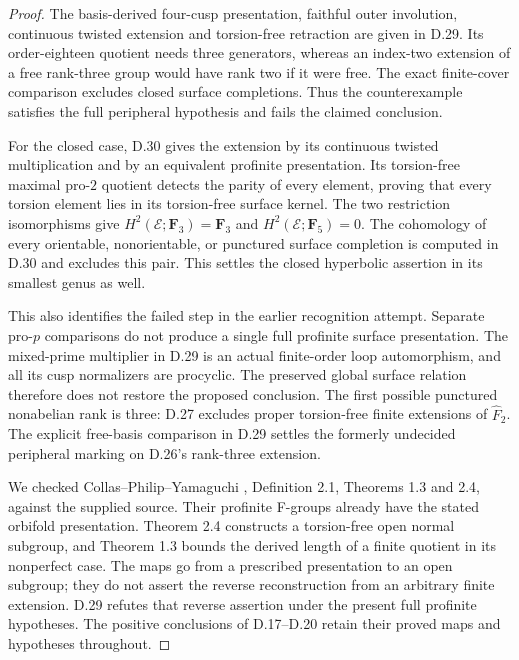 \begin{proof}
The basis-derived four-cusp presentation, faithful outer involution,
continuous twisted extension and torsion-free retraction are given
in D.29.  Its order-eighteen quotient needs three generators, whereas
an index-two extension of a free rank-three group would have rank two
if it were free.  The exact finite-cover comparison excludes closed
surface completions.  Thus the counterexample satisfies the full
peripheral hypothesis and fails the claimed conclusion.

For the closed case, D.30 gives the extension by its continuous
twisted multiplication and by an equivalent profinite presentation.
Its torsion-free maximal pro-$2$ quotient detects the parity of
every element, proving that every torsion element lies in its
torsion-free surface kernel. The two restriction isomorphisms give
$H^2(\mathcal E;\mathbf F_3)=\mathbf F_3$ and
$H^2(\mathcal E;\mathbf F_5)=0$. The cohomology of every orientable,
nonorientable, or punctured surface completion is computed in
D.30 and excludes this pair. This settles the closed hyperbolic
assertion in its smallest genus as well.

This also identifies the failed step in the earlier recognition
attempt.  Separate pro-$p$ comparisons do not produce a single
full profinite surface presentation.  The mixed-prime multiplier
in D.29 is an actual finite-order loop automorphism, and all its
cusp normalizers are procyclic.  The preserved global surface
relation therefore does not restore the proposed conclusion.
The first possible punctured nonabelian rank is three: D.27 excludes
proper torsion-free finite extensions of $\widehat F_2$.
The explicit free-basis comparison in D.29 settles the formerly
undecided peripheral marking on D.26's rank-three extension.

We checked Collas--Philip--Yamaguchi \cite{R-CPY}, Definition 2.1,
Theorems 1.3 and 2.4, against the supplied source.  Their profinite
F-groups already have the stated orbifold presentation.
Theorem 2.4 constructs a torsion-free open normal subgroup, and
Theorem 1.3 bounds the derived length of a finite quotient in its
nonperfect case.  The maps go from a prescribed presentation to
an open subgroup; they do not assert the reverse reconstruction
from an arbitrary finite extension.  D.29 refutes that reverse
assertion under the present full profinite hypotheses.  The
positive conclusions of D.17--D.20 retain their proved maps and
hypotheses throughout.
\end{proof}

